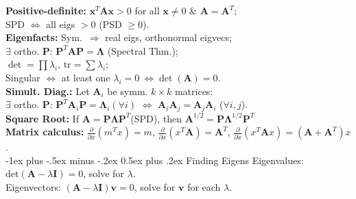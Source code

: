 \documentclass[10pt,landscape]{article}
\makeatletter
\renewcommand{\subsection}{\@startsection{subsection}{2}{0mm}%
                                {-1ex plus -.5ex minus -.2ex}%
                                {0.5ex plus .2ex}%
                                {\normalfont\small\bfseries}}
\makeatother
\begin{document}
\begin{multicols}{3}
\smallskip
\textbf{Positive-definite:} $\mathbf{x}^T \mathbf{A} \mathbf{x} > 0$ for all $\mathbf{x}\neq 0$ \& $\mathbf{A} = \mathbf{A}^T$;\\
\hspace*{1em} SPD $\Leftrightarrow$ all eigs $>0$ (PSD $\ge0$).\\
\smallskip
\textbf{Eigenfacts:} Sym.\ $\Rightarrow$ real eigs, orthonormal eigvecs; \\
\hspace*{1em} $\exists$ ortho. $\mathbf{P}$: $\mathbf{P}^T \mathbf{A} \mathbf{P} = \mathbf{\Lambda}$ (Spectral Thm.);\\
\hspace*{1em} $\det = \prod \lambda_i$, $\mathrm{tr} = \sum\lambda_i$;\\
\hspace*{1em} Singular $\Leftrightarrow$ at least one $\lambda_i = 0 \ \Leftrightarrow \det(\mathbf{A}) = 0$.\\
\smallskip
\textbf{Simult. Diag.:} Let $\mathbf{A}_i$ be symm. $k \times k$ matrices:\\
\hspace*{1em} $\exists$ ortho. $\mathbf{P}$: $\mathbf{P}^T \mathbf{A}_i \mathbf{P} = \mathbf{\Lambda}_i (\forall i)$ $\Leftrightarrow$ $\mathbf{A}_i \mathbf{A}_j=\mathbf{A}_j\mathbf{A}_i$ ($\forall i,j$).\\
\smallskip
\textbf{Square Root:} If $\mathbf A= \mathbf P\boldsymbol\Lambda\mathbf P^T$(SPD), then $\mathbf A^{1/2}= \mathbf P\boldsymbol\Lambda^{1/2}\mathbf P^T$\\
\smallskip
\textbf{Matrix calculus:} $\frac{\partial}{\partial x}(m^T x) = m$, 
$\frac{\partial}{\partial x}(x^T \mathbf{A}) = \mathbf{A}^T$, 
$\frac{\partial}{\partial x}(x^T \mathbf{A} x) = (\mathbf{A}+\mathbf{A}^T)x$.\\
\medskip
\subsection{Finding Eigens}
Eigenvalues: $\mathrm{det}(\mathbf A-\lambda\mathbf I) = 0$, solve for $\lambda$.\\
Eigenvectors: $(\mathbf A-\lambda\mathbf I)\mathbf v=0$, solve for $ \mathbf v$ for each $\lambda$.\\
\medskip

\end{multicols}
\end{document}
